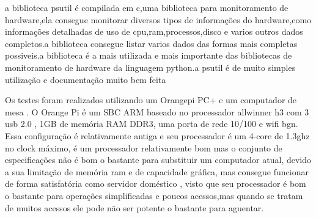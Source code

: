 \documentclass[
	12pt,				%
	openright,			%
	oneside,			%
	a4paper,			%
	english,			%
	french,				%
	spanish,			%
	brazil,				%
	]{abntex2}
\begin{document}
a biblioteca psutil é compilada em c,uma biblioteca para monitoramento de hardware,ela consegue monitorar diversos tipos de informações do hardware,como informações detalhadas de uso de cpu,ram,processos,disco e varios outros dados completos.a biblioteca consegue listar varios dados das formas mais completas possiveis.a biblioteca é a mais utilizada e mais importante das bibliotecas de monitoramento de hardware da linguagem python.a psutil é de muito simples utilização e documentação muito bem feita


Os testes foram realizados utilizando um Orangepi PC+ e um computador de mesa .
O Orange Pi é um SBC ARM baseado no processador allwinner h3 com 3 usb 2.0 , 1GB de memória RAM DDR3, uma porta de rede 10/100 e wifi bgn. Essa configuração é relativamente antiga e seu processador é um 4-core de 1.3ghz no clock máximo,
é um processador relativamente bom mas o conjunto de especificações não é bom o bastante para substituir um computador atual,
devido a sua limitação de memória ram e de capacidade gráfica, mas consegue funcionar de forma satisfatória como servidor doméstico ,
visto que seu processador é bom o bastante para operações simplificadas e poucos acessos,mas quando se tratam de muitos acessos ele pode não ser potente o bastante para aguentar.
\end{document}
